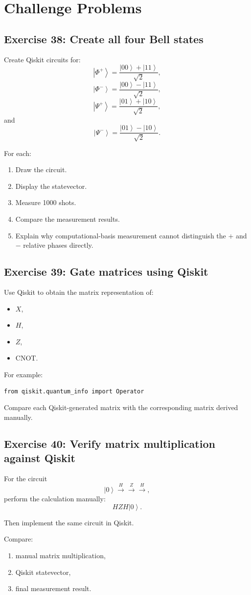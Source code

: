 \documentclass[12pt,a4paper]{article}
\newcommand{\ket}[1]{\left|#1\right\rangle}
\begin{document}
\section{Challenge Problems}

\subsection*{Exercise 38: Create all four Bell states}
Create Qiskit circuits for:
\[
\ket{\Phi^+}=
\frac{\ket{00}+\ket{11}}{\sqrt{2}},
\]
\[
\ket{\Phi^-}=
\frac{\ket{00}-\ket{11}}{\sqrt{2}},
\]
\[
\ket{\Psi^+}=
\frac{\ket{01}+\ket{10}}{\sqrt{2}},
\]
and
\[
\ket{\Psi^-}=
\frac{\ket{01}-\ket{10}}{\sqrt{2}}.
\]

For each:
\begin{enumerate}
    \item Draw the circuit.
    \item Display the statevector.
    \item Measure 1000 shots.
    \item Compare the measurement results.
    \item Explain why computational-basis measurement cannot distinguish the $+$ and $-$ relative phases directly.
\end{enumerate}

\subsection*{Exercise 39: Gate matrices using Qiskit}
Use Qiskit to obtain the matrix representation of:
\begin{itemize}
    \item $X$,
    \item $H$,
    \item $Z$,
    \item CNOT.
\end{itemize}

For example:
\begin{lstlisting}
from qiskit.quantum_info import Operator
\end{lstlisting}

Compare each Qiskit-generated matrix with the corresponding matrix derived manually.

\subsection*{Exercise 40: Verify matrix multiplication against Qiskit}
For the circuit
\[
\ket{0}
\xrightarrow{H}
\xrightarrow{Z}
\xrightarrow{H},
\]
perform the calculation manually:
\[
HZH\ket{0}.
\]

Then implement the same circuit in Qiskit.

Compare:
\begin{enumerate}
    \item manual matrix multiplication,
    \item Qiskit statevector,
    \item final measurement result.
\end{enumerate}
\end{document}
